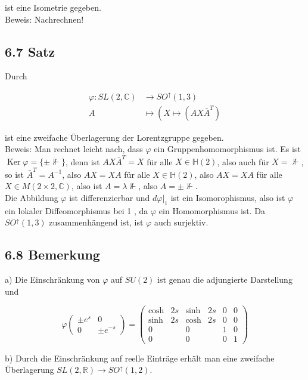 \documentclass[10pt, letterpaper]{article}
\begin{document}
ist eine Isometrie gegeben.\\
Beweis: Nachrechnen!

\subsection*{6.7 Satz}
Durch

$$
\begin{aligned}
\varphi: S L(2, \mathbb{C}) & \rightarrow S O^{\uparrow}(1,3) \\
A & \mapsto\left(X \mapsto\left(A X \bar{A}^{T}\right)\right.
\end{aligned}
$$

ist eine zweifache Überlagerung der Lorentzgruppe gegeben.\\
Beweis: Man rechnet leicht nach, dass $\varphi$ ein Gruppenhomomorphismus ist. Es ist $\operatorname{Ker} \varphi=\{ \pm \nVdash\}$, denn ist $A X \bar{A}^{T}=X$ für alle $X \in \mathbb{H}(2)$, also auch für $X=\nVdash$, so ist $\bar{A}^{T}=A^{-1}$, also $A X=X A$ für alle $X \in \mathbb{H}(2)$, also $A X=X A$ für alle $X \in M(2 \times 2, \mathbb{C})$, also ist $A=\lambda \nVdash$, also $A= \pm \nVdash$.\\
Die Abbildung $\varphi$ ist differenzierbar und $\left.d \varphi\right|_{1}$ ist ein Isomorophismus, also ist $\varphi$ ein lokaler Diffeomorphismus bei 1 , da $\varphi$ ein Homomorphismus ist. Da $S O^{\uparrow}(1,3)$ zusammenhängend ist, ist $\varphi$ auch surjektiv.

\subsection*{6.8 Bemerkung}
a) Die Einschränkung von $\varphi$ auf $S U(2)$ ist genau die adjungierte Darstellung und

$$
\varphi\left(\begin{array}{cc} 
\pm e^{s} & 0 \\
0 & \pm e^{-s}
\end{array}\right)=\left(\begin{array}{cccccc}
\cosh & 2 s & \sinh & 2 s & 0 & 0 \\
\sinh & 2 s & \cosh & 2 s & 0 & 0 \\
0 & & 0 & & 1 & 0 \\
0 & & 0 & & 0 & 1
\end{array}\right)
$$

b) Durch die Einschränkung auf reelle Einträge erhält man eine zweifache Überlagerung $S L(2, \mathbb{R}) \rightarrow S O^{\uparrow}(1,2)$.
\end{document}
